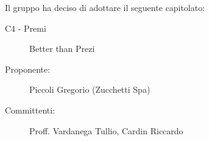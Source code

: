 Il gruppo ha deciso di adottare il seguente capitolato:
\begin{description}
  \item[C4 - Premi] Better than Prezi
  \item[Proponente:] Piccoli Gregorio (Zucchetti Spa)
  \item[Committenti:] Proff. Vardanega Tullio, Cardin Riccardo
\end{description}

